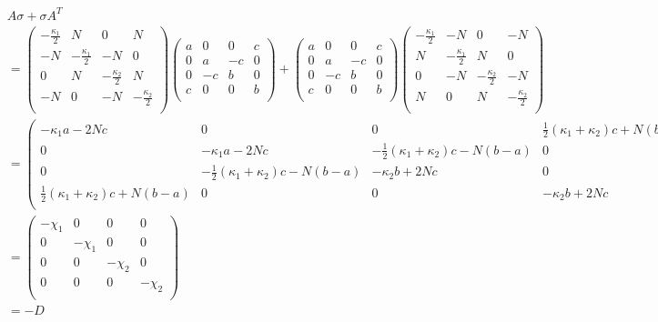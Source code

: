 \documentclass[11pt,a4paper]{article}
\numberwithin{equation}{section}
\begin{document}
	\begin{align*}
	&A\sigma +\sigma A^{T}&\\
	&= \begin{pmatrix}
	-\frac{\kappa_1}{2} & N & 0 & N\\
	-N & -\frac{\kappa_1}{2} & -N & 0 \\
	0 & N & -\frac{\kappa_2}{2} & N\\
	-N & 0 & -N & -\frac{\kappa_2}{2}\\
	\end{pmatrix}\begin{pmatrix}
	a & 0 & 0 & c\\
	0 & a & -c & 0\\
	0 & -c & b & 0 \\
	c & 0 & 0 & b\\
	\end{pmatrix} + \begin{pmatrix}
	a & 0 & 0 & c\\
	0 & a & -c & 0\\
	0 & -c & b & 0 \\
	c & 0 & 0 & b\\
	\end{pmatrix}\begin{pmatrix}
	-\frac{\kappa_1}{2} & -N & 0 & -N\\
	N & -\frac{\kappa_1}{2} & N & 0 \\
	0 & -N & -\frac{\kappa_2}{2} & -N\\
	N & 0 & N & -\frac{\kappa_2}{2}\\
	\end{pmatrix}&\\
	&= \begin{pmatrix}
	-\kappa_1 a - 2Nc & 0 & 0 & \frac{1}{2}(\kappa_1 + \kappa_2)c + N(b-a)\\
	0 & -\kappa_1 a - 2Nc & -\frac{1}{2}(\kappa_1 + \kappa_2)c - N(b-a) & 0 \\
	0 & -\frac{1}{2}(\kappa_1 + \kappa_2)c - N(b-a) & -\kappa_2 b + 2Nc & 0\\
	\frac{1}{2}(\kappa_1 + \kappa_2)c + N(b-a) & 0 & 0 & -\kappa_2 b + 2Nc\\
	\end{pmatrix}&\\
	&= \begin{pmatrix}
	-\chi_1 & 0 & 0 & 0\\
	0 & -\chi_1 & 0 & 0 \\
	0 & 0 & -\chi_2 & 0\\
	0 & 0 & 0 & -\chi_2\\
	\end{pmatrix}&\\
	&= -D&
	\end{align*}
	
\end{document}

